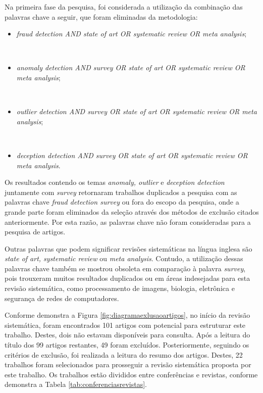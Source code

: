 \documentclass[smallextended]{svjour3}
\begin{document}
Na primeira fase da pesquisa, foi considerada a utilização da combinação das palavras chave a seguir, que foram eliminadas da metodologia:

\begin{itemize}
	\item \emph{fraud detection AND state of art OR systematic review OR meta analysis};
	
	\
	\item \emph{anomaly detection AND survey OR state of art OR systematic review OR meta analysis};
	
	\
	\item \emph{outlier detection AND survey OR state of art OR systematic review OR meta analysis}; 	
	
	\
	\item \emph{deception detection AND survey OR state of art OR systematic review OR meta analysis}.
\end{itemize}

Os resultados contendo os temas \emph{anomaly, outlier} e \emph{deception detection} juntamente com \emph{survey} retornaram trabalhos duplicados a pesquisa com as palavras chave \emph{fraud detection survey} ou fora do escopo da pesquisa, onde a grande parte foram eliminados da seleção através dos métodos de exclusão citados anteriormente. Por esta razão, as palavras chave não foram consideradas para a pesquisa de artigos.

Outras palavras que podem significar revisões sistemáticas na língua inglesa são \emph{state of art, systematic review} ou \emph{meta analysis}. Contudo, a utilização dessas palavras chave também se mostrou obsoleta em comparação à palavra \emph{survey}, pois trouxeram muitos resultados duplicados ou em áreas indesejadas para esta revisão sistemática, como processamento de imagens, biologia, eletrônica e segurança de redes de computadores.

Conforme demonstra a Figura \ref{fig:diagramaexlusaoartigos}, no início da revisão sistemática, foram encontrados 101 artigos com potencial para estruturar este trabalho. Destes, dois não estavam disponíveis para consulta. Após a leitura do título dos 99 artigos restantes, 49 foram excluídos. Posteriormente, seguindo os critérios de exclusão, foi realizada a leitura do resumo dos artigos. Destes, 22 trabalhos foram selecionados para prosseguir a revisão sistemática proposta por este trabalho. Os trabalhos estão divididos entre conferências e revistas, conforme demonstra a Tabela \ref{tab:conferenciasrevistas}.
\end{document}
